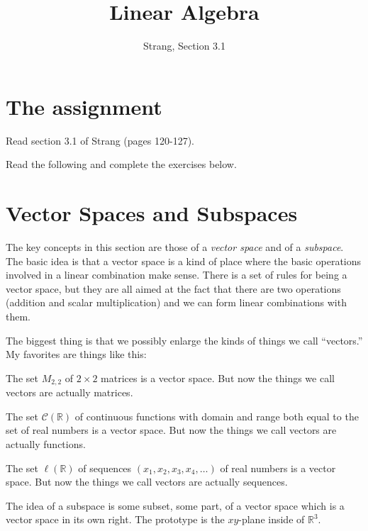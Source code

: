 \documentclass[11pt]{amsart}
\theoremstyle{definition}
\begin{document}
\title{Linear Algebra}
\author{Strang, Section 3.1}
\maketitle

\section{The assignment}
\begin{compactitem}
\item Read section 3.1 of Strang (pages 120-127).
\item Read the following and complete the exercises below.
\end{compactitem}


\section{Vector Spaces and Subspaces}

The key concepts in this section are those of a \emph{vector space} and of a \emph{subspace}. The basic idea is that a vector space is a kind of place where the basic operations involved in a linear combination make sense. There is a set of rules for being a vector space, but they are all aimed at the fact that there are two operations  (addition and scalar multiplication) and we can form linear combinations with them.

The biggest thing is that we possibly enlarge the kinds of things we call ``vectors.'' My favorites are things like this:
\begin{compactitem}
\item The set $M_{2,2}$ of $2\times 2$ matrices is a vector space. But now the things we call vectors are actually matrices.

\item The set $\mathcal{C}(\mathbb{R})$ of continuous functions with domain and range both equal to the set of real numbers is a vector space. But now the things we call vectors are actually functions.

\item The set $\ell(\mathbb{R})$ of sequences $(x_1, x_2, x_3, x_4, \ldots)$ of real numbers is a vector space. But now the things we call vectors are actually sequences.
\end{compactitem}


The idea of a subspace is some subset, some part, of a vector space which is a vector space in its own right. The prototype is the $xy$-plane inside of $\mathbb{R}^3$.
\end{document}
